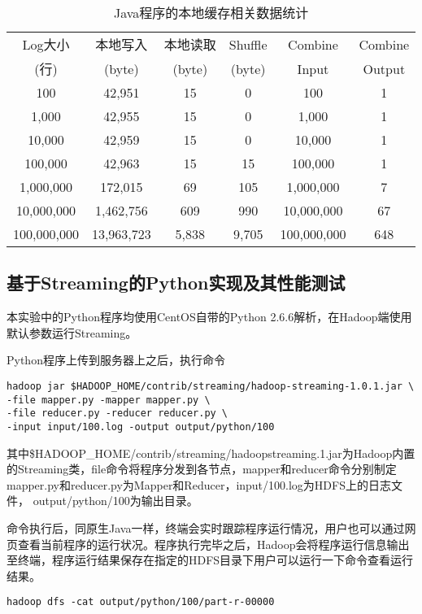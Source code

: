\begin{table}[htbp]
 \caption{\label{tab:java2}Java程序的本地缓存相关数据统计}
 \centering
 \begin{tabular}{cccccc}
  \toprule
  Log大小 & 本地写入 & 本地读取 & Shuffle & Combine & Combine\\
  (行) & (byte) & (byte) & (byte) &  Input & Output\\
  \midrule
  100 & 42,951 & 15 & 0 & 100 & 1\\
  1,000 & 42,955 & 15 & 0 & 1,000 & 1\\
  10,000 & 42,959 & 15 & 0 & 10,000 & 1\\
  100,000 & 42,963 & 15 & 15 & 100,000 & 1\\
  1,000,000 & 172,015 & 69 & 105 & 1,000,000 & 7\\
  10,000,000 & 1,462,756 & 609 & 990 & 10,000,000 & 67\\
  100,000,000 & 13,963,723 & 5,838 & 9,705 & 100,000,000 & 648\\
  \bottomrule
 \end{tabular}
\end{table}

\subsection{基于Streaming的Python实现及其性能测试}

本实验中的Python程序均使用CentOS自带的Python 2.6.6解析，在Hadoop端使用默认参数运行Streaming。

Python程序上传到服务器上之后，执行命令

\begin{verbatim}
hadoop jar $HADOOP_HOME/contrib/streaming/hadoop-streaming-1.0.1.jar \
-file mapper.py -mapper mapper.py \
-file reducer.py -reducer reducer.py \
-input input/100.log -output output/python/100
\end{verbatim}

其中\$HADOOP\_HOME/contrib/streaming/hadoop\-streaming.1.jar为Hadoop内置的Streaming类，\-file命令将程序分发到各节点，\-mapper和\-reducer命令分别制定mapper.py和reducer.py为Mapper和Reducer，input/100.log为HDFS上的日志文件， output/python/100为输出目录。

命令执行后，同原生Java一样，终端会实时跟踪程序运行情况，用户也可以通过网页查看当前程序的运行状况。程序执行完毕之后，Hadoop会将程序运行信息输出至终端，程序运行结果保存在指定的HDFS目录下用户可以运行一下命令查看运行结果。

\begin{verbatim}
hadoop dfs -cat output/python/100/part-r-00000
\end{verbatim}

